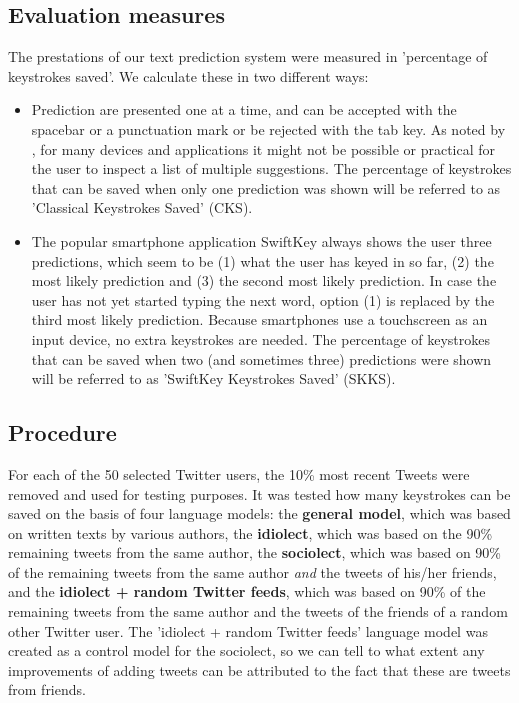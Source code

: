 \documentclass[11pt]{article}
\begin{document}
\subsection{Evaluation measures}
The prestations of our text prediction system were measured in 'percentage of keystrokes saved'. We calculate these in two different ways:
\begin{itemize}
\item Prediction are presented one at a time, and can be accepted with the spacebar or a punctuation mark or be rejected with the tab key. As noted by , for many devices and applications it might not be possible or practical for the user to inspect a list of multiple suggestions. The percentage of keystrokes that can be saved when only one prediction was shown will be referred to as 'Classical Keystrokes Saved' (CKS).
\item The popular smartphone application SwiftKey always shows the user three predictions, which seem to be (1) what the user has keyed in so far, (2) the most likely prediction and (3) the second most likely prediction. In case the user has not yet started typing the next word, option (1) is replaced by the third most likely prediction. Because smartphones use a touchscreen as an input device, no extra keystrokes are needed. The percentage of keystrokes that can be saved when two (and sometimes three) predictions were shown will be referred to as 'SwiftKey Keystrokes Saved' (SKKS).
\end{itemize}

\subsection{Procedure}
For each of the 50 selected Twitter users, the 10\% most recent Tweets were removed and used for testing purposes. It was tested how many keystrokes can be saved on the basis of four language models: the \textbf{general model}, which was based on written texts by various authors, the \textbf{idiolect}, which was based on the 90\% remaining tweets from the same author, the \textbf{sociolect}, which was based on 90\% of the remaining tweets from the same author \emph{and} the tweets of his/her friends, and the \textbf{idiolect + random Twitter feeds}, which was based on 90\% of the remaining tweets from the same author and the tweets of the friends of a random other Twitter user. The 'idiolect + random Twitter feeds' language model was created as a control model for the sociolect, so we can tell to what extent any improvements of adding tweets can be attributed to the fact that these are tweets from friends.
\end{document}
